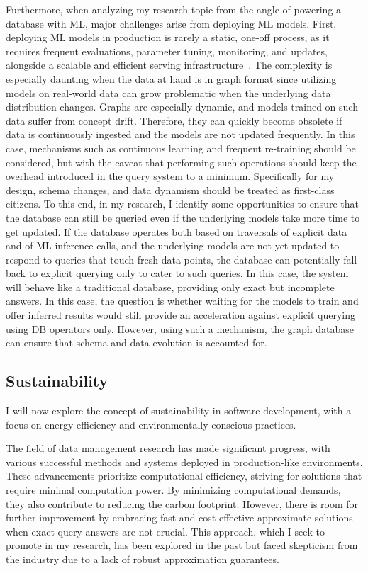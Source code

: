 \documentclass[a4paper, 11pt]{article}
\begin{document}
Furthermore, when analyzing my research topic from the angle of powering a database with ML, major challenges arise from deploying ML models. First, deploying ML models in production is rarely a static, one-off process, as it requires frequent evaluations, parameter tuning, monitoring, and updates, alongside a scalable and efficient serving infrastructure~\cite{DBLP:conf/nips/SculleyHGDPECYC15}. The complexity is especially daunting when the data at hand is in graph format since utilizing models on real-world data can grow problematic when the underlying data distribution changes. Graphs are especially dynamic, and models trained on such data suffer from concept drift. Therefore, they can quickly become obsolete if data is continuously ingested and the models are not updated frequently. In this case, mechanisms such as continuous learning and frequent re-training should be considered, but with the caveat that performing such operations should keep the overhead introduced in the query system to a minimum. Specifically for my design, schema changes, and data dynamism should be treated as first-class citizens. To this end, in my research, I identify some opportunities to ensure that the database can still be queried even if the underlying models take more time to get updated. If the database operates both based on traversals of explicit data and of ML inference calls, and the underlying models are not yet updated to respond to queries that touch fresh data points, the database can potentially fall back to explicit querying only to cater to such queries. In this case, the system will behave like a traditional database, providing only exact but incomplete answers. In this case, the question is whether waiting for the models to train and offer inferred results would still provide an acceleration against explicit querying using DB operators only. However, using such a mechanism, the graph database can ensure that schema and data evolution is accounted for.  


\subsection{Sustainability}

I will now explore the concept of sustainability in software development, with a focus on energy efficiency and environmentally conscious practices.

The field of data management research has made significant progress, with various successful methods and systems deployed in production-like environments. These advancements prioritize computational efficiency, striving for solutions that require minimal computation power. By minimizing computational demands, they also contribute to reducing the carbon footprint. However, there is room for further improvement by embracing fast and cost-effective approximate solutions when exact query answers are not crucial. This approach, which I seek to promote in my research, has been explored in the past but faced skepticism from the industry due to a lack of robust approximation guarantees.
\end{document}
